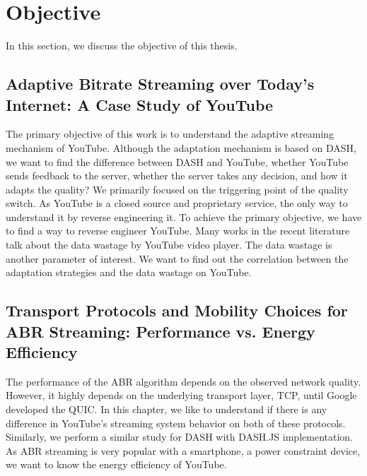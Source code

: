 \section{Objective}
In this section, we discuss the objective of this thesis.

\subsection{Adaptive Bitrate Streaming over Today's Internet: A Case Study of YouTube}
The primary objective of this work is to understand the adaptive streaming mechanism of YouTube. Although the adaptation mechanism is based on DASH, we want to find the difference between DASH and YouTube, whether YouTube sends feedback to the server, whether the server takes any decision, and how it adapts the quality? We primarily focused on the triggering point of the quality switch. As YouTube is a closed source and proprietary service, the only way to understand it by reverse engineering it. To achieve the primary objective, we have to find a way to reverse engineer YouTube. Many works in the recent literature talk about the data wastage by YouTube video player. The data wastage is another parameter of interest. We want to find out the correlation between the adaptation strategies and the data wastage on YouTube.

\subsection{Transport Protocols and Mobility Choices for ABR Streaming: Performance vs. Energy Efficiency}
The performance of the ABR algorithm depends on the observed network quality. However, it highly depends on the underlying transport layer, TCP, until Google developed the QUIC. In this chapter, we like to understand if there is any difference in YouTube's streaming system behavior on both of these protocols. Similarly, we perform a similar study for DASH with DASH.JS implementation. As ABR streaming is very popular with a smartphone, a power constraint device, we want to know the energy efficiency of YouTube. 


